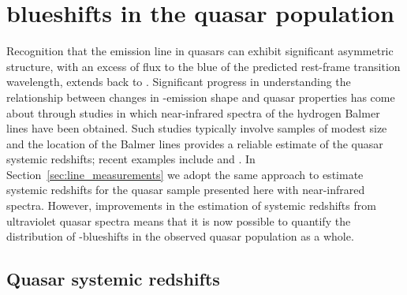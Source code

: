 \section{ blueshifts in the quasar population}
\label{sec:blueshifts}

Recognition that the  emission line in quasars can exhibit significant asymmetric structure, with an excess of flux to the blue of the predicted rest-frame transition wavelength, extends back to \citet{gaskell82}. 
Significant progress in understanding the relationship between changes in -emission shape and quasar properties has come about through studies in which near-infrared spectra of the hydrogen Balmer lines have been obtained. 
Such studies typically involve samples of modest size and the location of the Balmer lines provides a reliable estimate of the quasar systemic redshifts; recent examples include \citet{shen12} and \citet{marziani16}. 
In Section~\ref{sec:line_measurements} we adopt the same approach to estimate systemic redshifts for the quasar sample presented here with near-infrared spectra.  
However, improvements in the estimation of systemic redshifts from ultraviolet quasar spectra means that it is now possible to quantify the distribution of -blueshifts in the observed quasar population as a whole. 

\subsection{Quasar systemic redshifts}
\label{sub:sysredshifts}

